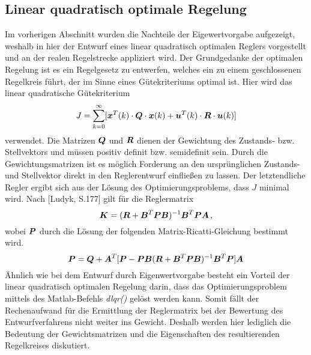 \subsection{Linear quadratisch optimale Regelung}
Im vorherigen Abschnitt wurden die Nachteile der Eigewertvorgabe aufgezeigt, weshalb in hier der Entwurf eines linear quadratisch optimalen Reglers vorgestellt und an der realen Regelstrecke appliziert wird. Der Grundgedanke der optimalen Regelung ist es ein Regelgesetz zu entwerfen, welches ein zu einem geschlossenen Regelkreis führt, der im Sinne eines Gütekriteriums optimal ist. Hier wird das linear quadratische Gütekriterium
\begin{equation}
J = \sum^{\infty}_{k=0} [\boldsymbol{x}^T(k)\cdot \boldsymbol{Q} \cdot \boldsymbol{x}(k) + \boldsymbol{u}^T(k)\cdot \boldsymbol{R}\cdot \boldsymbol{u}(k)]
\end{equation}
verwendet. Die Matrizen $\boldsymbol{Q}$ und $\boldsymbol{R}$ dienen der Gewichtung des Zustands- bzw. Stellvektors und müssen positiv definit bzw. semidefinit sein. Durch die Gewichtungsmatrizen ist es möglich Forderung an den ursprünglichen Zustands- und Stellvektor direkt in den Reglerentwurf einfließen zu lassen. Der letztendliche Regler ergibt sich aus der Lösung des Optimierungsproblems, dass $J$ minimal wird. Nach [Ludyk, S.177] gilt für die Reglermatrix
\begin{equation}
\boldsymbol{K} = (\boldsymbol{R}+\boldsymbol{B}^T\boldsymbol{P}\boldsymbol{B})^{-1}\boldsymbol{B}^T\boldsymbol{P}\boldsymbol{A}\,,
\end{equation}
wobei $\boldsymbol{P}$ durch die Lösung der folgenden Matrix-Ricatti-Gleichung bestimmt wird.
\begin{equation}
\boldsymbol{P} = \boldsymbol{Q}+\boldsymbol{A}^T[\boldsymbol{P}-\boldsymbol{P}\boldsymbol{B}(\boldsymbol{R}+\boldsymbol{B}^T\boldsymbol{P}\boldsymbol{B})^{-1}\boldsymbol{B}^T\boldsymbol{P}]\boldsymbol{A}
\end{equation}
Ähnlich wie bei dem Entwurf durch Eigenwertvorgabe besteht ein Vorteil der linear quadratisch optimalen Regelung darin, dass das Optimierungsproblem mittels des Matlab-Befehls \textit{dlqr()} gelöst werden kann. Somit fällt der Rechenaufwand für die Ermittlung der Reglermatrix bei der Bewertung des Entwurfverfahrens nicht weiter ins Gewicht. Deshalb werden hier lediglich die Bedeutung der Gewichtsmatrizen und die Eigenschaften des resultierenden Regelkreises diskutiert.

